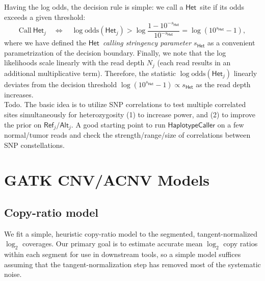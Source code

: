 \documentclass[nofootinbib,amssymb,amsmath]{revtex4}
\newcommand{\HET}{$\mathsf{Het}$}
\begin{document}
Having the log odds, the decision rule is simple: we call a \HET~site if its odds exceeds a given threshold:
\begin{equation}
\mathrm{Call}~\mathsf{Het}_j \quad \Leftrightarrow \quad \log \mathrm{odds}(\mathsf{Het}_j) > \log\frac{1 - 10^{-s_\mathsf{Het}}}{10^{-s_\mathsf{Het}}} = \log(10^{s_\mathsf{Het}}-1),
\end{equation}
where we have defined the {\em \HET~calling stringency parameter $s_\mathsf{Het}$} as a convenient parametrization of the decision boundary. Finally, we note that the log likelihoods scale linearly with the read depth $N_j$ (each read results in an additional multiplicative term). Therefore, the statistic $\log \mathrm{odds}(\mathsf{Het}_j)$ linearly deviates from the decision threshold $\log(10^{s_\mathsf{Het}}-1) \propto s_\mathsf{Het}$ as the read depth increases.\\

Todo. The basic idea is to utilize SNP correlations to test multiple correlated sites simultaneously for heterozygosity (1) to increase power, and (2) to improve the prior on $\mathsf{Ref}_j/\mathsf{Alt}_j$. A good starting point to run $\mathsf{HaplotypeCaller}$ on a few normal/tumor reads and check the strength/range/size of correlations between SNP constellations.

\section{GATK CNV/ACNV Models} \label{models}

\subsection{Copy-ratio model} \label{copy-ratio-model}

We fit a simple, heuristic copy-ratio model to the segmented, tangent-normalized $\log_2$ coverages.  Our primary goal is to estimate accurate mean $\log_2$ copy ratios within each segment for use in downstream tools, so a simple model suffices assuming that the tangent-normalization step has removed most of the systematic noise.
\end{document}
